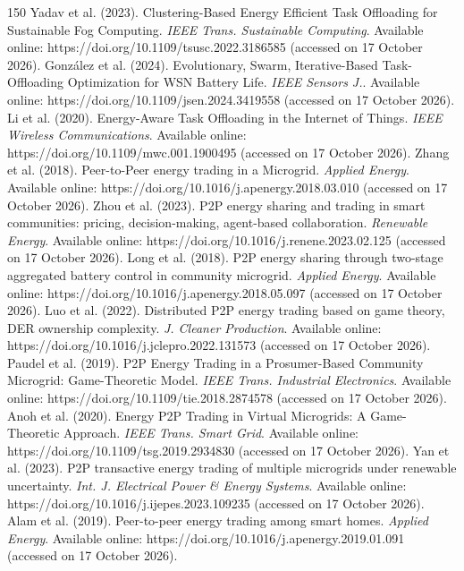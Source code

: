\begin{thebibliography}{150}
Yadav et al. (2023). Clustering-Based Energy Efficient Task Offloading for Sustainable Fog Computing. \textit{IEEE Trans. Sustainable Computing}. Available online: https://doi.org/10.1109/tsusc.2022.3186585 (accessed on 17 October 2026).
González et al. (2024). Evolutionary, Swarm, Iterative-Based Task-Offloading Optimization for WSN Battery Life. \textit{IEEE Sensors J.}. Available online: https://doi.org/10.1109/jsen.2024.3419558 (accessed on 17 October 2026).
Li et al. (2020). Energy-Aware Task Offloading in the Internet of Things. \textit{IEEE Wireless Communications}. Available online: https://doi.org/10.1109/mwc.001.1900495 (accessed on 17 October 2026).
Zhang et al. (2018). Peer-to-Peer energy trading in a Microgrid. \textit{Applied Energy}. Available online: https://doi.org/10.1016/j.apenergy.2018.03.010 (accessed on 17 October 2026).
Zhou et al. (2023). P2P energy sharing and trading in smart communities: pricing, decision-making, agent-based collaboration. \textit{Renewable Energy}. Available online: https://doi.org/10.1016/j.renene.2023.02.125 (accessed on 17 October 2026).
Long et al. (2018). P2P energy sharing through two-stage aggregated battery control in community microgrid. \textit{Applied Energy}. Available online: https://doi.org/10.1016/j.apenergy.2018.05.097 (accessed on 17 October 2026).
Luo et al. (2022). Distributed P2P energy trading based on game theory, DER ownership complexity. \textit{J. Cleaner Production}. Available online: https://doi.org/10.1016/j.jclepro.2022.131573 (accessed on 17 October 2026).
Paudel et al. (2019). P2P Energy Trading in a Prosumer-Based Community Microgrid: Game-Theoretic Model. \textit{IEEE Trans. Industrial Electronics}. Available online: https://doi.org/10.1109/tie.2018.2874578 (accessed on 17 October 2026).
Anoh et al. (2020). Energy P2P Trading in Virtual Microgrids: A Game-Theoretic Approach. \textit{IEEE Trans. Smart Grid}. Available online: https://doi.org/10.1109/tsg.2019.2934830 (accessed on 17 October 2026).
Yan et al. (2023). P2P transactive energy trading of multiple microgrids under renewable uncertainty. \textit{Int. J. Electrical Power \& Energy Systems}. Available online: https://doi.org/10.1016/j.ijepes.2023.109235 (accessed on 17 October 2026).
Alam et al. (2019). Peer-to-peer energy trading among smart homes. \textit{Applied Energy}. Available online: https://doi.org/10.1016/j.apenergy.2019.01.091 (accessed on 17 October 2026).

\end{thebibliography}
